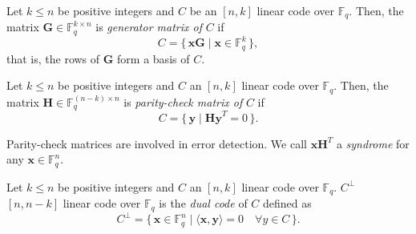 \begin{definition}
Let $k \leq n$ be positive integers and $C$ be an $[n, k]$ linear code over $\mathbb{F}_q$. Then, the matrix $\mathbf{G} \in \mathbb{F}_q^{k \times n}$ is \textit{generator matrix of} $C$ if 
\[
C = 
\{\, \mathbf{xG} \mid \mathbf{x} \in \mathbb{F}_q^k\,\},
\]
that is, the rows of $\mathbf{G}$ form a basis of $C$.
\end{definition}

\begin{definition}
Let $k \leq n$ be positive integers and $C$ an $[n, k]$ linear code over $\mathbb{F}_q$. Then, the matrix $\mathbf{H} \in \mathbb{F}_q^{(n-k) \times n}$ is \textit{parity-check matrix of} $C$ if
\[
C = 
\{\, \mathbf{y} \mid \mathbf{Hy}^T = 0\,\}.
\]
\end{definition}
Parity-check matrices are involved in error detection.
We call $\mathbf{xH}^T$ a \textit{syndrome} for any $\mathbf{x} \in \mathbb{F}_q^n$.

\begin{definition}
Let $k \leq n$ be positive integers and $C$ an $[n, k]$ linear code over $\mathbb{F}_q$. $C^\perp$ $[n, n-k]$ linear code over $\mathbb{F}_q$ is the \textit{dual code} of $C$ defined as
\[
C^\perp =
\{\, \mathbf{x} \in \mathbb{F}_q^n \mid \langle \mathbf{x}, \mathbf{y} \rangle = 0 \quad \forall y \in C\,\}.
\]
\end{definition}

